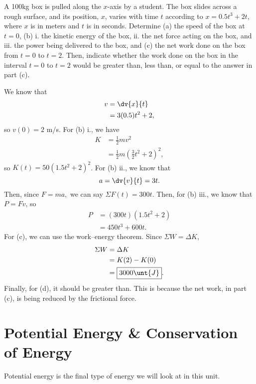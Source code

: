 \documentclass[11pt]{article}
\begin{document}
\begin{example}[AP 2003 \# 1]
	A 100kg box is pulled along the $x$-axis by a student. The box slides across a rough surface, and its position, $x$, varies with time $t$ according to $x = 0.5t^3 + 2t$, where $x$ is in meters and $t$ is in seconds. Determine (a) the speed of the box at $t = 0$, (b) i. the kinetic energy of the box, ii. the net force acting on the box, and iii. the power being delivered to the box, and (c) the net work done on the box from $t = 0$ to $t = 2$. Then, indicate whether the work done on the box in the interval $t = 0$ to $t = 2$ would be greater than, less than, or equal to the answer in part (c).
\end{example}
\begin{solution}
	We know that
	\begin{align*}
		v &= \dv{x}{t} \\
		&= 3(0.5)t^2 + 2,
	\end{align*}
	so $v(0) = 2$ m/s. For (b) i., we have
	\begin{align*}
		K &= \frac{1}{2}mv^2 \\
		&= \frac{1}{2}m\left(\frac{3}{2}t^2 + 2\right)^2,
	\end{align*}
	so $K(t) = \boxed{50\left(1.5t^2 +2\right)^2}$. For (b) ii., we know that
	\[a = \dv{v}{t} = 3t.\]
	Then, since $F = ma,$ we can say $\Sigma F(t) = \boxed{300t}$. Then, for (b) iii., we know that $P = Fv$, so
	\begin{align*}
		P &= (300t)(1.5t^2 + 2) \\
		&= \boxed{450t^3 + 600t}.
	\end{align*}
	For (c), we can use the work--energy theorem. Since $\Sigma W = \Delta K$,
	\begin{align*}
		\Sigma W &= \Delta K \\
		&= K(2) - K(0) \\
		&= \boxed{3000\unt{J}}.
	\end{align*}
	Finally, for (d), it should be greater than. This is because the net work, in part (c), is being reduced by the frictional force.
\end{solution}

\section{Potential Energy \& Conservation of Energy}
Potential energy is the final type of energy we will look at in this unit.
\end{document}
